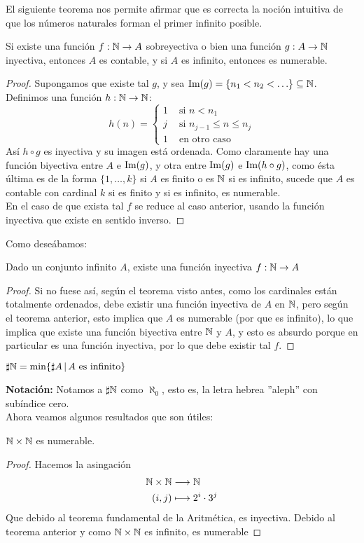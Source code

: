 \documentclass[12pt,a4paper]{book}
\begin{document}
El siguiente teorema nos permite afirmar que es correcta la noción intuitiva de que los números naturales forman el primer infinito posible.
\begin{teo}
Si existe una función $f: \mathbb{N} \rightarrow A$ sobreyectiva o bien una función $g: A \rightarrow \mathbb{N}$ inyectiva, entonces $A$ es contable, y si $A$ es infinito, entonces es numerable.
\begin{proof}
Supongamos que existe tal $g$, y sea $\mbox{Im}(g) = \{ n_1 < n_2 < \ldots \} \subseteq \mathbb{N}$. Definimos una función $h: \mathbb{N} \rightarrow \mathbb{N}$:
$$
h(n) =
\begin{cases}
1 &\mbox{   si $n < n_1$}\\
j &\mbox{   si $n_{j-1} \leq n \leq n_j$}\\
1 &\mbox{   en otro caso}
\end{cases}
$$
Así $h\circ g$ es inyectiva y su imagen está ordenada. Como claramente hay una función biyectiva entre $A$ e $\mbox{Im}(g)$, y otra entre $\mbox{Im}(g)$ e $\mbox{Im}(h \circ g)$, como ésta última es de la forma $\{1, \ldots , k\}$ si $A$ es finito o es $\mathbb{N}$ si es infinito, sucede que $A$ es contable con cardinal $k$ si es finito y si es infinito, es numerable.\\
En el caso de que exista tal $f$ se reduce al caso anterior, usando la función inyectiva que existe en sentido inverso.
\end{proof}
\end{teo}
Como deseábamos:
\begin{cor}
Dado un conjunto infinito $A$, existe una función inyectiva $f:\mathbb{N} \rightarrow A$
\begin{proof}
Si no fuese así, según el teorema visto antes, como los cardinales están totalmente ordenados, debe existir una función inyectiva de $A$ en $\mathbb{N}$, pero según el teorema anterior, esto implica que $A$ es numerable (por que es infinito), lo que implica que existe una función biyectiva entre $\mathbb{N}$ y $A$, y esto es absurdo porque en particular es una función inyectiva, por lo que debe existir tal $f$.
\end{proof}
\end{cor}
\begin{cor}
$\sharp \mathbb{N} = \min \{ \sharp A \,\vert\, A \mbox{ es infinito}\}$
\end{cor}
\textbf{Notación:} Notamos a $\sharp \mathbb{N}$ como $ \aleph_0$, esto es, la letra hebrea ''aleph'' con subíndice cero.\\[0.5cm]
Ahora veamos algunos resultados que son útiles:
\begin{teo}
$\mathbb{N} \times \mathbb{N}$ es numerable.
\begin{proof}
Hacemos la asingación
\begin{align*}
\mathbb{N} \times \mathbb{N} &\longrightarrow \mathbb{N} \\
(i,j) &\longmapsto 2^i \cdot 3^j
\end{align*}
Que debido al teorema fundamental de la Aritmética, es inyectiva. Debido al teorema anterior y como $\mathbb{N} \times \mathbb{N}$ es infinito, es numerable
\end{proof}
\end{teo}
\end{document}
